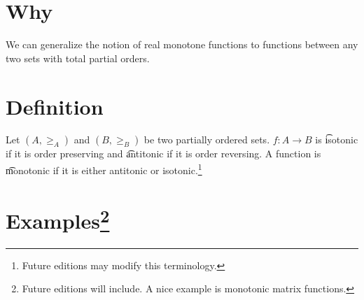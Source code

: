 
\section*{Why}

We can generalize the notion of real monotone functions to functions between any two sets with total partial orders.

\section*{Definition}

Let $(A, \geq_A)$ and $(B, \geq_B)$ be two partially ordered sets.
$f:A \to B$ is \t{isotonic} if it is order preserving and \t{antitonic} if it is order reversing.
A function is \t{monotonic} if it is either antitonic or isotonic.\footnote{Future editions may modify this terminology.}

\section*{Examples\footnote{Future editions will include. A nice example is monotonic matrix functions.}}

\blankpage